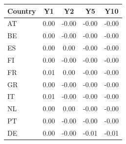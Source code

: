 \begin{tabular}{lcccc}
\toprule
Country & Y1 & Y2 & Y5 & Y10 \\
\midrule
AT & 0.00 & -0.00 & -0.00 & -0.00 \\
BE & 0.00 & -0.00 & -0.00 & -0.00 \\
ES & 0.00 & 0.00 & -0.00 & -0.00 \\
FI & 0.00 & -0.00 & -0.00 & -0.00 \\
FR & 0.01 & 0.00 & -0.00 & -0.00 \\
GR & 0.00 & -0.00 & -0.00 & -0.00 \\
IT & 0.01 & -0.00 & -0.00 & -0.00 \\
NL & 0.00 & 0.00 & -0.00 & -0.00 \\
PT & 0.00 & -0.00 & -0.00 & -0.00 \\
DE & 0.00 & -0.00 & -0.01 & -0.01 \\
\bottomrule
\end{tabular}
